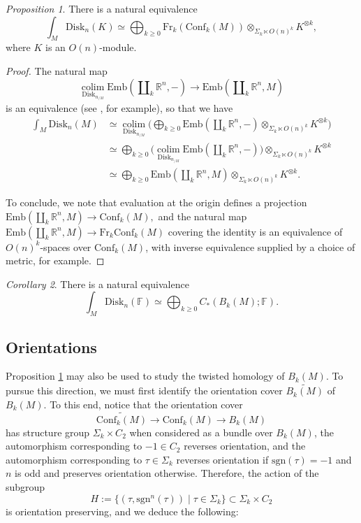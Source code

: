 \documentclass{compositio}
\theoremstyle{definition}\newtheorem{definition}{Definition}[section]
\theoremstyle{theorem}\newtheorem{lemma}[definition]{Lemma}
\theoremstyle{remark}\newtheorem*{conventions}{Conventions}
\theoremstyle{remark}\newtheorem*{acknowledgments}{Acknowledgments}
\theoremstyle{remark}\newtheorem*{outline}{Outline}
\theoremstyle{remark}\newtheorem*{questions}{Questions}
\theoremstyle{remark}\newtheorem{example}[definition]{Example}
\theoremstyle{definition}\newtheorem{construction}[definition]{Construction}
\theoremstyle{definition}\newtheorem*{convention}{Convention}
\theoremstyle{definition}\newtheorem*{conjecture}{Conjecture}
\theoremstyle{theorem}\newtheorem{theorem}[definition]{Theorem}
\theoremstyle{theorem}\newtheorem{paradigm}[definition]{Paradigm}
\theoremstyle{remark}\newtheorem{remark}[definition]{Remark}
\theoremstyle{corollary}\newtheorem{corollary}[definition]{Corollary}
\theoremstyle{theorem}\newtheorem{proposition}[definition]{Proposition}
\theoremstyle{definition}\newtheorem{question}[definition]{Question}
\begin{document}
\begin{proposition}\label{free}
There is a natural equivalence $$\int_M{\mathrm{Disk}}_n(K)\simeq \bigoplus_{k\geq0}{\mathrm{Fr}}_{k}({\mathrm{Conf}}_k(M))\otimes_{\Sigma_k\ltimes O(n)^k}K^{\otimes k},$$ where $K$ is an $O(n)$-module.
\end{proposition}

\begin{proof}
The natural map $$\operatorname*{\mathrm{colim}}_{{\mathrm{Disk}}_{n_{/M}}}{\mathrm{Emb}}(\amalg_k\mathbb{R}^n,-)\to{\mathrm{Emb}}(\amalg_k\mathbb{R}^n,M)$$ is an equivalence (see \cite{Lurie}, for example), so that we have \begin{align*}\int_M{\mathrm{Disk}}_n(M)&\simeq\operatorname*{\mathrm{colim}}_{{\mathrm{Disk}}_{n_{/M}}}\bigg(\bigoplus_{k\geq0}{\mathrm{Emb}}(\amalg_k\mathbb{R}^n,-)\otimes_{\Sigma_k\ltimes O(n)^k}K^{\otimes k}\bigg)\\
&\simeq \bigoplus_{k\geq0}\bigg(\operatorname*{\mathrm{colim}}_{{\mathrm{Disk}}_{n_{/M}}}{\mathrm{Emb}}(\amalg_k\mathbb{R}^n,-)\bigg)\otimes_{\Sigma_k\ltimes O(n)^k}K^{\otimes k}\\
&\simeq\bigoplus_{k\geq0}{\mathrm{Emb}}(\amalg_k\mathbb{R}^n,M)\otimes_{\Sigma_k\ltimes O(n)^k}K^{\otimes k}.
\end{align*} 

\noindent To conclude, we note that evaluation at the origin defines a projection ${\mathrm{Emb}}(\amalg_k\mathbb{R}^n,M)\to {\mathrm{Conf}}_k(M),$ and the natural map ${\mathrm{Emb}}(\amalg_k\mathbb{R}^n,M)\to{\mathrm{Fr}}_k{\mathrm{Conf}}_k(M)$ covering the identity is an equivalence of $O(n)^k$-spaces over ${\mathrm{Conf}}_k(M)$, with inverse equivalence supplied by a choice of metric, for example.
\end{proof}

\begin{corollary}\label{homology}
There is a natural equivalence $$\int_M{\mathrm{Disk}}_n(\mathbb{F})\simeq \bigoplus_{k\geq0}C_*(B_k(M);\mathbb{F}).$$
\end{corollary}

\subsection{Orientations}\label{covers}

Proposition \ref{free} may also be used to study the twisted homology of $B_k(M)$. To pursue this direction, we must first identify the orientation cover $\widetilde{B_k(M)}$ of $B_k(M)$. To this end, notice that the orientation cover $$\widetilde{{\mathrm{Conf}}_k(M)}\to {\mathrm{Conf}}_k(M)\to B_k(M)$$ has structure group $\Sigma_k\times C_2$ when considered as a bundle over $B_k(M)$, the automorphism corresponding to $-1\in C_2$ reverses orientation, and the automorphism corresponding to $\tau\in \Sigma_k$ reverses orientation if ${\mathrm{sgn}}(\tau)=-1$ and $n$ is odd and preserves orientation otherwise. Therefore, the action of the subgroup $$H:=\{(\tau,{\mathrm{sgn}}^n(\tau))\mid\tau\in \Sigma_k\}\subset \Sigma_k\times C_2$$ is orientation preserving, and we deduce the following:
\end{document}
